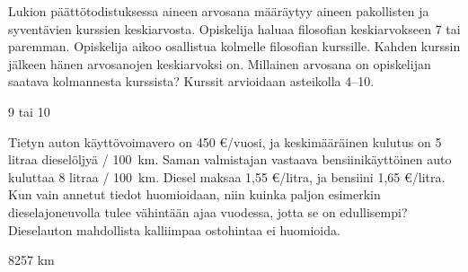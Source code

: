 \begin{tehtava}
Lukion päättötodistuksessa aineen arvosana määräytyy aineen pakollisten ja syventävien kurssien keskiarvosta. Opiskelija haluaa filosofian keskiarvokseen 7 tai paremman. Opiskelija aikoo osallistua kolmelle filosofian kurssille. Kahden kurssin jälkeen hänen arvosanojen keskiarvoksi on. Millainen arvosana on opiskelijan saatava kolmannesta kurssista? Kurssit arvioidaan asteikolla 4--10.
\begin{vastaus}
9 tai 10
\end{vastaus}
\end{tehtava}

\begin{tehtava}
	Tietyn auton käyttövoimavero on 450 \euro /vuosi, ja keskimääräinen kulutus on 5 litraa dieselöljyä / 100~km. Saman valmistajan vastaava bensiinikäyttöinen auto kuluttaa 8 litraa / 100~km. Diesel maksaa 1,55 \euro /litra, ja bensiini 1,65 \euro /litra. Kun vain annetut tiedot huomioidaan, niin kuinka paljon esimerkin dieselajoneuvolla tulee vähintään ajaa vuodessa, jotta se on edullisempi? Dieselauton mahdollista kalliimpaa ostohintaa ei huomioida.
    \begin{vastaus}
        8257 km
    \end{vastaus}
\end{tehtava}

